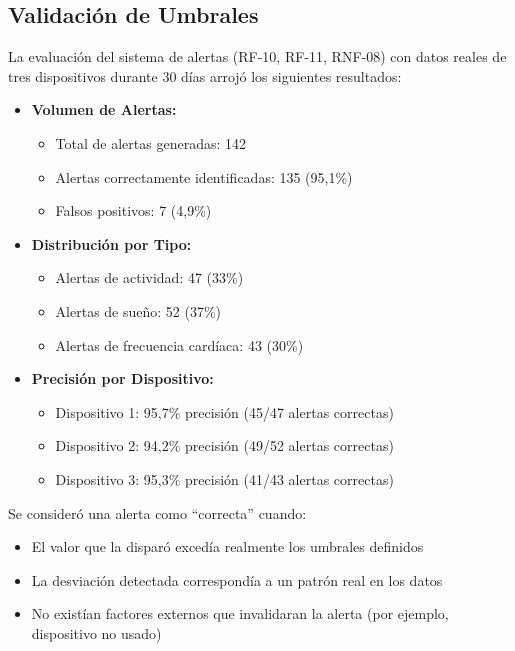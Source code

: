 \subsection{Validación de Umbrales}
La evaluación del sistema de alertas (RF-10, RF-11, RNF-08) con datos reales de tres dispositivos durante 30 días arrojó los siguientes resultados:

\begin{itemize}
    \item \textbf{Volumen de Alertas:}
        \begin{itemize}
            \item Total de alertas generadas: 142
            \item Alertas correctamente identificadas: 135 (95,1\%)
            \item Falsos positivos: 7 (4,9\%)
        \end{itemize}
    \item \textbf{Distribución por Tipo:}
        \begin{itemize}
            \item Alertas de actividad: 47 (33\%)
            \item Alertas de sueño: 52 (37\%)
            \item Alertas de frecuencia cardíaca: 43 (30\%)
        \end{itemize}
    \item \textbf{Precisión por Dispositivo:}
        \begin{itemize}
            \item Dispositivo 1: 95,7\% precisión (45/47 alertas correctas)
            \item Dispositivo 2: 94,2\% precisión (49/52 alertas correctas)
            \item Dispositivo 3: 95,3\% precisión (41/43 alertas correctas)
        \end{itemize}
\end{itemize}

Se consideró una alerta como \enquote{correcta} cuando:
\begin{itemize}
    \item El valor que la disparó excedía realmente los umbrales definidos
    \item La desviación detectada correspondía a un patrón real en los datos
    \item No existían factores externos que invalidaran la alerta (por ejemplo, dispositivo no usado)
\end{itemize}

